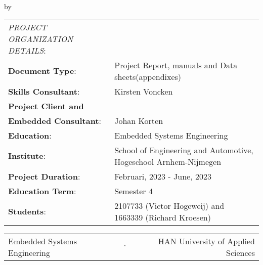 \begin{titlepage}

\begin{center}

{\makeatletter
\largetitlestyle\fontsize{45}{45}\selectfont\@title
\makeatother}

\bigskip

{\makeatletter
\vspace{12mm}
\ifdefvoid{\@subtitle}{}{\largetitlestyle\fontsize{20}{20}\selectfont\@subtitle}
\makeatother}

\bigskip
\bigskip

by

\bigskip
\bigskip

{\makeatletter
\largetitlestyle\fontsize{25}{25}\selectfont\@author
\makeatother}

\bigskip
\bigskip



\vfill

\begin{tabular}{ll}
\textit{PROJECT ORGANIZATION DETAILS}:       \\
\textbf{Document Type}: & Project Report, manuals and Data sheets(appendixes)\\
\textbf{Skills Consultant}:                          & Kirsten Voncken \\ 
\textbf{Project Client and}\\ \textbf{Embedded Consultant}:                    & Johan Korten \\
\textbf{Education}:                          & Embedded Systems Engineering \\
\textbf{Institute}:                          & School of Engineering and Automotive, Hogeschool Arnhem-Nijmegen\\
\textbf{Project Duration}: & Februari, 2023 - June, 2023 \\
\textbf{Education Term}: &Semester 4\\
\textbf{Students}: & 2107733 (Victor Hogeweij) and 1663339 (Richard Kroesen)\\
\end{tabular}

\vspace*{1cm}


\vspace*{2cm}
  \begin{center}
    \begin{tabular}{lcr}
      Embedded Systems Engineering & $\cdot$ & HAN University of Applied Sciences
    \end{tabular}
  \end{center}

\end{center}

\end{titlepage}
